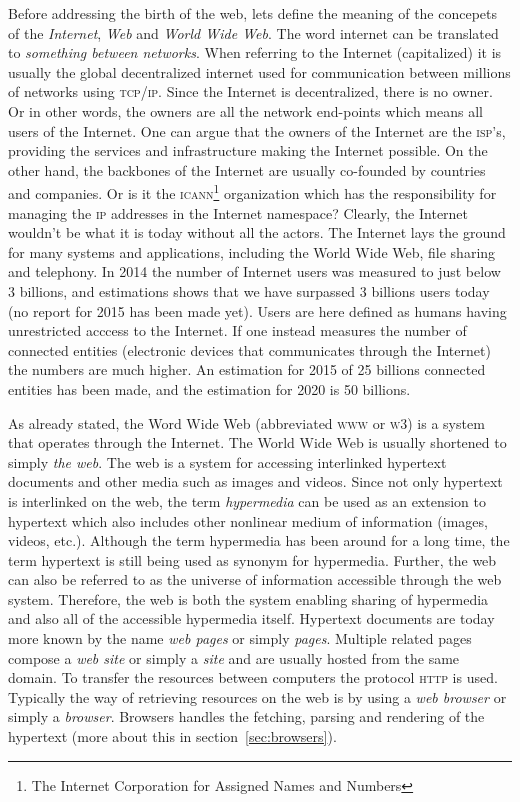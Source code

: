 \documentclass[a4paper,11pt]{kth-mag}
\begin{document}
      Before addressing the birth of the web, lets define the meaning of the concepets of the \emph{Internet}, \emph{Web} and \emph{World Wide Web}.
      The word internet can be translated to \emph{something between networks}. 
      When referring to the Internet (capitalized) it is usually the global decentralized internet used for communication between millions of networks using \textsc{tcp/ip}.
      Since the Internet is decentralized, there is no owner.
      Or in other words, the owners are all the network end-points which means all users of the Internet.
      One can argue that the owners of the Internet are the \textsc{isp}'s, providing the services and infrastructure making the Internet possible.
      On the other hand, the backbones of the Internet are usually co-founded by countries and companies.
      Or is it the \textsc{icann}\footnote{The Internet Corporation for Assigned Names and Numbers} organization which has the responsibility for managing the \textsc{ip} addresses in the Internet namespace?
      Clearly, the Internet wouldn't be what it is today without all the actors.
      The Internet lays the ground for many systems and applications, including the World Wide Web, file sharing and telephony.
      In 2014 the number of Internet users was measured to just below 3 billions, and estimations shows that we have surpassed 3 billions users today (no report for 2015 has been made yet).
      Users are here defined as humans having unrestricted acccess to the Internet.
      If one instead measures the number of connected entities (electronic devices that communicates through the Internet) the numbers are much higher.
      An estimation for 2015 of 25 billions connected entities has been made, and the estimation for 2020 is 50 billions.
      
      As already stated, the Word Wide Web (abbreviated \textsc{www} or \textsc{w3}) is a system that operates through the Internet.
      The World Wide Web is usually shortened to simply \emph{the web}.
      The web is a system for accessing interlinked hypertext documents and other media such as images and videos.
      Since not only hypertext is interlinked on the web, the term \emph{hypermedia} can be used as an extension to hypertext which also includes other nonlinear medium of information (images, videos, etc.).
      Although the term hypermedia has been around for a long time, the term hypertext is still being used as synonym for hypermedia.
      Further, the web can also be referred to as the universe of information accessible through the web system.
      Therefore, the web is both the system enabling sharing of hypermedia and also all of the accessible hypermedia itself.
      Hypertext documents are today more known by the name \emph{web pages} or simply \emph{pages}.
      Multiple related pages compose a \emph{web site} or simply a \emph{site} and are usually hosted from the same domain.
      To transfer the resources between computers the protocol \textsc{http} is used.
      Typically the way of retrieving resources on the web is by using a \emph{web browser} or simply a \emph{browser}.
      Browsers handles the fetching, parsing and rendering of the hypertext (more about this in section~\ref{sec:browsers}).
      
\end{document}
